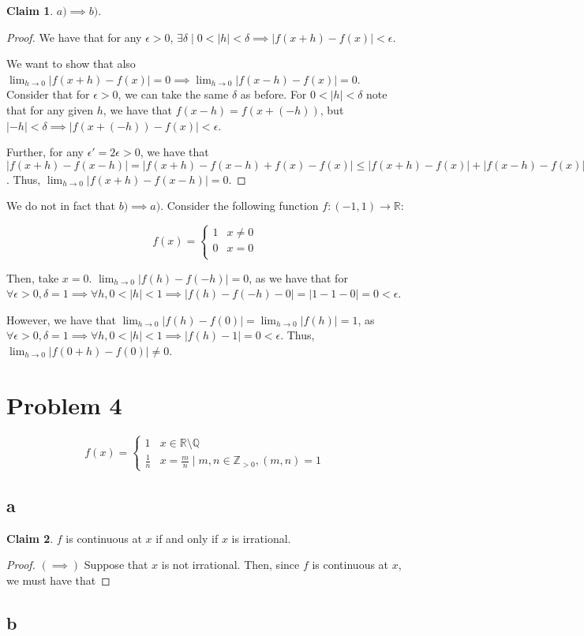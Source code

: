 \documentclass[12pt,letterpaper]{article}
\theoremstyle{definition}
\newtheorem*{claim}{Claim}
\newcommand{\R}{\mathbb{R}}
\newcommand{\Zg}{\mathbb{Z}_{>0}}
\newcommand{\Q}{\mathbb{Q}}
\begin{document}
\begin{claim}
  $a) \implies b)$.
\end{claim}

\begin{proof}
  We have that for any $\epsilon > 0$, $\exists \delta \mid 0 < |h| < \delta
  \implies |f(x+h) - f(x)| < \epsilon$.

  We want to show that also $\lim_{h\rightarrow 0}|f(x + h) - f(x)| = 0 \implies
  \lim_{h\rightarrow 0}|f(x - h) -f(x)| = 0$. Consider that for $\epsilon > 0$,
  we can take the same $\delta$ as before. For $0 < |h| < \delta$ note that for
  any given $h$, we have that $f(x-h) =
  f(x+(-h))$, but $|-h| < \delta \implies |f(x + (-h)) - f(x)| < \epsilon$.
  
  Further, for any $\epsilon' = 2\epsilon > 0$, we have that $|f(x + h) - f(x - h)| = |f(x +
  h) - f(x - h) + f(x) - f(x)| \leq |f(x + h) - f(x)| + |f(x -h) - f(x)| <
  2\epsilon = \epsilon'$. Thus, $\lim_{h\rightarrow 0}|f(x+h)-f(x-h)| = 0$.
\end{proof}

We do not in fact that $b) \implies a)$. Consider the following function
$f:(-1,1) \rightarrow \R$:

\[
  f(x) = \begin{cases}
    1 & x \neq 0 \\
    0 & x = 0 \\
  \end{cases}
\]

Then, take $x = 0$. $\lim_{h\rightarrow 0}|f(h) - f(-h)| = 0$, as we have that
for $\forall \epsilon > 0, \delta = 1 \implies \forall h, 0 < |h| < 1 \implies |f(h) -
f(-h) - 0| = |1-1 - 0| = 0 < \epsilon$.

However, we have that $\lim_{h\rightarrow 0}|f(h) - f(0)| = \lim_{h\rightarrow
  0}|f(h)| = 1$, as $\forall \epsilon > 0, \delta = 1 \implies \forall h, 0 <
|h| < 1 \implies |f(h) - 1| = 0 < \epsilon$. Thus, $\lim_{h\rightarrow
  0}|f(0+h) - f(0)| \neq 0$.

\section*{Problem 4}

\[
  f(x) = \begin{cases}
    1 & x \in \R \setminus \Q \\
    \frac{1}{n} & x = \frac{m}{n} \mid m, n \in \Zg, (m,n) = 1 
  \end{cases}
\]

\subsection*{a}

\begin{claim}
  $f$ is continuous at $x$ if and only if $x$ is irrational.
\end{claim}

\begin{proof}
  $(\implies)$ Suppose that $x$ is not irrational. Then, since $f$ is continuous
  at $x$, we must have that 
\end{proof}

\subsection*{b}
\end{document}
